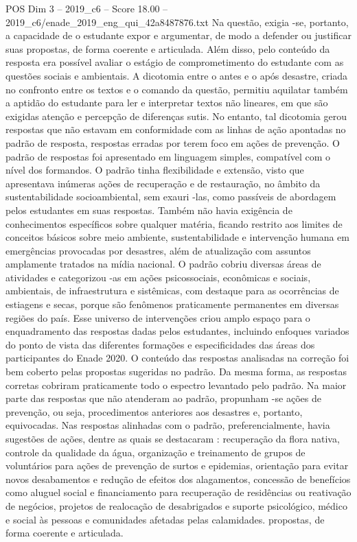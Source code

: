 \begin{textsample}{POS Dim 3 – 2019\_c6 – Score 18.00 – 2019\_c6/enade\_2019\_eng\_qui\_42a8487876.txt}
Na questão, exigia -se, portanto, a capacidade de o estudante expor e argumentar, de modo a defender ou justificar suas propostas, de forma coerente e articulada.
Além disso, pelo conteúdo da resposta era possível avaliar o estágio de comprometimento do estudante com as questões sociais e ambientais.
A dicotomia entre o antes e o após desastre, criada no confronto entre os textos e o comando da questão, permitiu aquilatar também a aptidão do estudante para ler e interpretar textos não lineares, em que são exigidas atenção e percepção de diferenças sutis.
No entanto, tal dicotomia gerou respostas que não estavam em conformidade com as linhas de ação apontadas no padrão de resposta, respostas erradas por terem foco em ações de prevenção.
O padrão de respostas foi apresentado em linguagem simples, compatível com o nível dos formandos.
O padrão tinha flexibilidade e extensão, visto que apresentava inúmeras ações de recuperação e de restauração, no âmbito da sustentabilidade socioambiental, sem exauri -las, como passíveis de abordagem pelos estudantes em suas respostas.
Também não havia exigência de conhecimentos específicos sobre qualquer matéria, ficando restrito aos limites de conceitos básicos sobre meio ambiente, sustentabilidade e intervenção humana em emergências provocadas por desastres, além de atualização com assuntos amplamente tratados na mídia nacional.
O padrão cobriu diversas áreas de atividades e categorizou -as em ações psicossociais, econômicas e sociais, ambientais, de infraestrutura e sistêmicas, com destaque para as ocorrências de estiagens e secas, porque são fenômenos praticamente permanentes em diversas regiões do país.
Esse universo de intervenções criou amplo espaço para o enquadramento das respostas dadas pelos estudantes, incluindo enfoques variados do ponto de vista das diferentes formações e especificidades das áreas dos participantes do Enade 2020.
O conteúdo das respostas analisadas na correção foi bem coberto pelas propostas sugeridas no padrão.
Da mesma forma, as respostas corretas cobriram praticamente todo o espectro levantado pelo padrão.
Na maior parte das respostas que não atenderam ao padrão, propunham -se ações de prevenção, ou seja, procedimentos anteriores aos desastres e, portanto, equivocadas.
Nas respostas alinhadas com o padrão, preferencialmente, havia sugestões de ações, dentre as quais se destacaram : recuperação da flora nativa, controle da qualidade da água, organização e treinamento de grupos de voluntários para ações de prevenção de surtos e epidemias, orientação para evitar novos desabamentos e redução de efeitos dos alagamentos, concessão de benefícios como aluguel social e financiamento para recuperação de residências ou reativação de negócios, projetos de realocação de desabrigados e suporte psicológico, médico e social às pessoas e comunidades afetadas pelas calamidades. propostas, de forma coerente e articulada.

\end{textsample}
